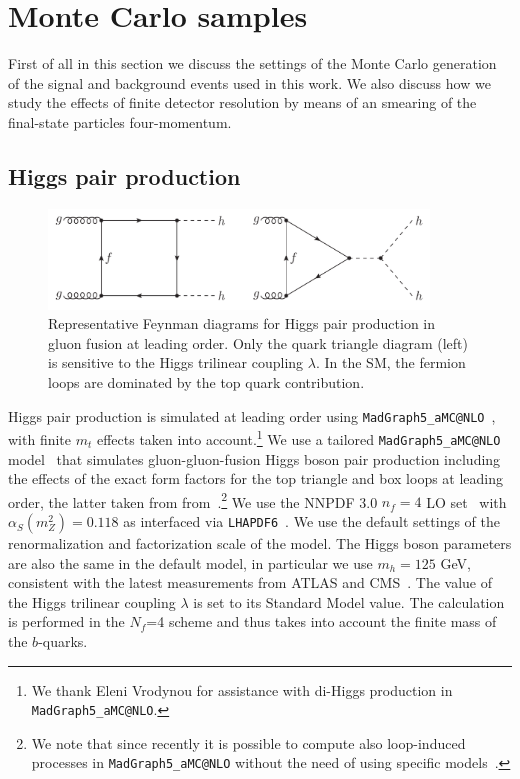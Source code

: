 \section{Monte Carlo samples}
\label{mcgeneration}

First of all in this section we discuss the settings of the
Monte Carlo generation of the signal and background
events used in this work.
%
We also discuss how we study the effects of finite detector
resolution by means of an smearing of the final-state
particles four-momentum.

\subsection{Higgs pair production}


\begin{figure}[t]
\begin{center}
  \includegraphics[width=0.90\textwidth]{plots/hhFeyn.pdf}
  \caption{\small Representative Feynman diagrams
    for Higgs pair production in gluon fusion at
    leading order.
    Only the quark triangle diagram (left) is sensitive to the Higgs trilinear coupling
    $\lambda$.
    In the SM, the fermion loops are dominated by the top quark contribution.
}
\label{fig:hhFeyn}
\end{center}
\end{figure}

Higgs pair production is simulated at leading order using
{\tt MadGraph5\_aMC@NLO}~\cite{Alwall:2014hca}, with finite $m_t$ effects taken into
account.\footnote{We thank Eleni Vrodynou for assistance with di-Higgs production
  in {\tt MadGraph5\_aMC@NLO}.}
%
We use a tailored {\tt MadGraph5\_aMC@NLO} model~\cite{Maltoni:2014eza} that simulates
gluon-gluon-fusion Higgs boson pair production including the effects
of the
exact form factors for the top triangle and box loops at leading
order, the latter taken from from~\cite{Plehn:1996wb}.\footnote{We note that since recently it is possible to compute also
loop-induced processes in {\tt MadGraph5\_aMC@NLO} without the need of using specific
models~\cite{Hirschi:2015iia}.}
%
We use the NNPDF 3.0 $n_f = 4$ LO set~\cite{Ball:2014uwa} with
$\alpha_S(m_Z^2)=0.118$
as interfaced via {\tt LHAPDF6}~\cite{Buckley:2014ana}.
%
We use the default settings of the renormalization and factorization
scale of the model.
%
The Higgs boson parameters are also the same in the default model,
in particular we use $m_h=125$ GeV, consistent with the latest
measurements from ATLAS and CMS~\cite{Aad:2014aba,Khachatryan:2014jba}.
%
The value of the Higgs trilinear coupling $\lambda$ is set to its
Standard Model value.
%
The calculation is performed in the
$N_f$=4 scheme and thus
takes into account the finite mass of the $b$-quarks.


